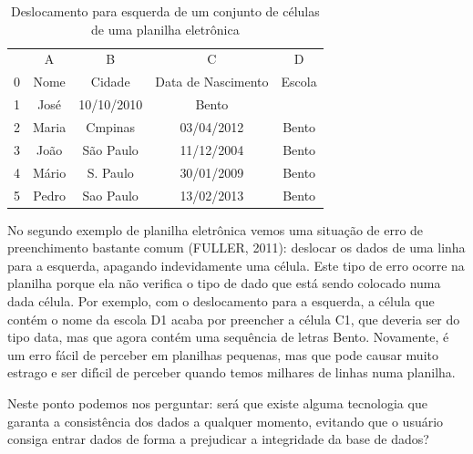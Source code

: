 \documentclass[
12pt,		%
openright,	%
twoside,  %
a4paper,			%
chapter=TITLE,		%
english,			%
french,				%
spanish,			%
brazil				%
]{USPSC-classe/USPSC}
\begin{document}
\begin{table}[htb]
\tiny
\caption{\label{f6feaa39313aa0691b7fdadc84175a203e68bf77}Deslocamento para esquerda de um conjunto de c\'elulas de uma planilha eletr\^onica}

\centering
\begin{tabular}{|c|c|c|c|c|}
\hline
  &  A  &  B  &  C  &  D  \\
0 & Nome  &  Cidade  &  Data de Nascimento  &  Escola \\
1 & Jos\'e  &  10/10/2010  &  Bento  &   \\
2 & Maria  &  Cmpinas  &  03/04/2012  &  Bento \\
3 & Jo\~ao  &  S\~ao Paulo  &  11/12/2004  &  Bento \\
4 & M\'ario  &  S. Paulo  &  30/01/2009  &  Bento \\
5 & Pedro  &  Sao Paulo  &  13/02/2013  &  Bento \\
\hline
\end{tabular}
\end{table}


No segundo exemplo de planilha eletr\^onica vemos uma situa\c{c}\~ao de erro de preenchimento bastante comum  (FULLER, 2011): deslocar os dados de uma linha para a esquerda, apagando indevidamente uma c\'elula. Este tipo de erro ocorre na planilha porque ela n\~ao verifica o tipo de dado que est\'a sendo colocado numa dada c\'elula. Por exemplo, com o deslocamento para a esquerda, a c\'elula que cont\'em o nome da escola D1 acaba por preencher a c\'elula C1, que deveria ser do tipo data, mas que agora cont\'em uma sequ\^encia de letras \textquotedbl Bento\textquotedbl . Novamente, \'e um erro f\'acil de perceber em planilhas pequenas, mas que pode causar muito estrago e ser dif\'{\i}cil de perceber quando temos milhares de linhas numa planilha.

















Neste ponto podemos nos perguntar: ser\'a que existe alguma tecnologia que garanta a consist\^encia dos dados a qualquer momento, evitando que o usu\'ario consiga entrar dados de forma a prejudicar a integridade da base de dados?
\end{document}
